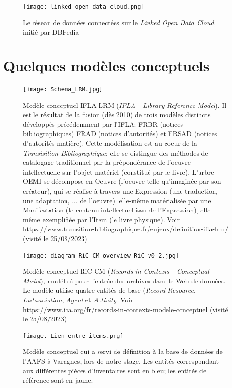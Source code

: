 \documentclass[a4paper,12pt,twoside]{book}
\begin{document}
        
\begin{figure}[h]
    \centering
    \texttt{[image: linked\_open\_data\_cloud.png]}
    \caption{Le réseau de données connectées sur le \textit{Linked Open Data Cloud}, initié par DBPedia}
    \label{fig:enter-label}
\end{figure}
 
        \chapter{Quelques modèles conceptuels}\label{annexe-modconcept}
 \begin{figure}[h]\label{mod-ifla-lrm}
    \centering
    \texttt{[image: Schema\_LRM.jpg]}
    \caption{Modèle conceptuel IFLA-LRM (\textit{IFLA - Library Reference Model}). Il est le résultat de la fusion (dès 2010) de trois modèles distincts développés précédemment par l'IFLA: FRBR (notices bibliographiques) FRAD (notices d'autorités) et FRSAD (notices d'autorités matière). Cette modélisation est au coeur de la \textit{Transisition Bibliographique}; elle se distingue des méthodes de catalogage traditionnel par la prépondérance de l'oeuvre intellectuelle sur l'objet matériel (constitué par le livre). L'arbre OEMI se décompose en Oeuvre (l'oeuvre telle qu'imaginée par son créateur), qui se réalise à travers une Expression (une traduction, une adaptation, ... de l'oeuvre), elle-même matérialisée par une Manifestation (le contenu intellectuel issu de l'Expression), elle-même exemplifiée par l'Item (le livre physique). Voir https://www.transition-bibliographique.fr/enjeux/definition-ifla-lrm/ (visité le 25/08/2023)}
    \label{fig:enter-label}
\end{figure}



\begin{figure}[h]
    \centering
    \texttt{[image: diagram\_RiC-CM-overview-RiC-v0-2.jpg]}
    \caption{Modèle conceptuel RiC-CM (\textit{Records in Contexts - Conceptual Model}), modélisé pour l'entrée des archives dans le Web de données. Le modèle utilise quatre entités de base (\textit{Record Resource}, \textit{Instanciation}, \textit{Agent} et \textit{Activity}. Voir https://www.ica.org/fr/records-in-contexts-modele-conceptuel (visité le 25/08/2023)}
    \label{fig:enter-label}
\end{figure}

\begin{figure}[h]
    \centering
    \texttt{[image: Lien entre items.png]}
    \caption{Modèle conceptuel qui a servi de définition à la base de données de l'AAFS à Varagnes, lors de notre stage. Les entités correspondant aux différentes pièces d'inventaires sont en bleu; les entités de référence sont en jaune.}
    \label{fig:enter-label}
\end{figure}
        
\end{document}
